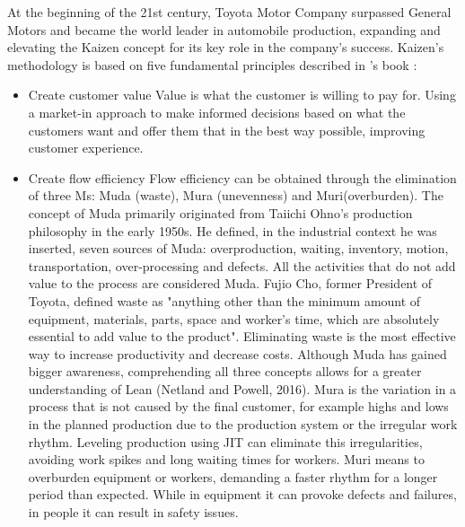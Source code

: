 \documentclass[]{article}
\begin{document}
At the beginning of the 21st century, Toyota Motor Company surpassed General Motors and
became the world leader in automobile production, expanding and elevating the Kaizen concept
for its key role in the company’s success. Kaizen’s methodology is based on five
fundamental principles described in \citeauthor{massaki_gemba_2015}'s book \cite{massaki_gemba_2015} :
\begin{itemize}
  \item Create customer value
    \subitem Value is what the customer is willing to pay for. Using a market-in approach to make
informed decisions based on what the customers want and offer them that in the best way
possible, improving customer experience.
  
  \item Create flow efficiency
    \subitem Flow efficiency can be obtained through the elimination of three Ms: Muda (waste), Mura (unevenness) and Muri(overburden).
    The concept of Muda primarily originated from Taiichi Ohno’s production philosophy in the
    early 1950s. He defined, in the industrial context he was inserted, seven sources of Muda:
    overproduction, waiting, inventory, motion, transportation, over-processing and defects. All
    the activities that do not add value to the process are considered Muda. Fujio Cho, former
    President of Toyota, defined waste as "anything other than the minimum amount of equipment, materials, parts, space and worker’s time, which are absolutely essential to add value
    to the product". Eliminating waste is the most effective way to increase productivity and
    decrease costs.
    Although Muda has gained bigger awareness, comprehending all three concepts allows for
    a greater understanding of Lean (Netland and Powell, 2016). Mura is the variation in a
    process that is not caused by the final customer, for example highs and lows in the planned
    production due to the production system or the irregular work rhythm. Leveling production
    using JIT can eliminate this irregularities, avoiding work spikes and long waiting times for
    workers. Muri means to overburden equipment or workers, demanding a faster rhythm for
    a longer period than expected. While in equipment it can provoke defects and failures, in
    people it can result in safety issues.


\end{itemize}
\end{document}
